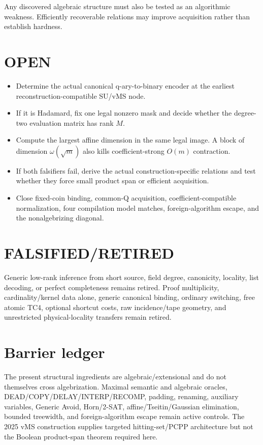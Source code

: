 \documentclass[11pt]{article}
\begin{document}
Any discovered algebraic structure must also be tested as an algorithmic weakness. Efficiently recoverable relations may improve acquisition rather than establish hardness.

\section*{OPEN}
\begin{itemize}
\item Determine the actual canonical q-ary-to-binary encoder at the earliest reconstruction-compatible SU/vMS node.
\item If it is Hadamard, fix one legal nonzero mask and decide whether the degree-two evaluation matrix has rank $M$.
\item Compute the largest affine dimension in the same legal image. A block of dimension $\omega(\sqrt m)$ also kills coefficient-strong $O(m)$ contraction.
\item If both falsifiers fail, derive the actual construction-specific relations and test whether they force small product span or efficient acquisition.
\item Close fixed-coin binding, common-Q acquisition, coefficient-compatible normalization, four compilation model matches, foreign-algorithm escape, and the nonalgebrizing diagonal.
\end{itemize}

\section*{FALSIFIED/RETIRED}
Generic low-rank inference from short source, field degree, canonicity, locality, list decoding, or perfect completeness remains retired. Proof multiplicity, cardinality/kernel data alone, generic canonical binding, ordinary switching, free atomic TC4, optional shortcut costs, raw incidence/tape geometry, and unrestricted physical-locality transfers remain retired.

\section*{Barrier ledger}
The present structural ingredients are algebraic/extensional and do not themselves cross algebrization. Maximal semantic and algebraic oracles, DEAD/COPY/DELAY/INTERP/RECOMP, padding, renaming, auxiliary variables, Generic Avoid, Horn/2-SAT, affine/Tseitin/Gaussian elimination, bounded treewidth, and foreign-algorithm escape remain active controls. The 2025 vMS construction supplies targeted hitting-set/PCPP architecture but not the Boolean product-span theorem required here.
\end{document}

